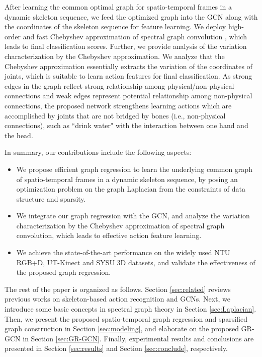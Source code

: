 \documentclass[conference]{IEEEtran}
\begin{document}
After learning the common optimal graph for spatio-temporal frames in a dynamic skeleton sequence, we feed the optimized graph into the GCN along with the coordinates of the skeleton sequence for feature learning. We deploy high-order and fast Chebyshev approximation of spectral graph convolution \cite{defferrard2016convolutional}, which leads to final classification scores. Further, we provide analysis of the variation characterization by the Chebyshev approximation. We analyze that the Chebyshev approximation essentially extracts the variation of the coordinates of joints, which is suitable to learn action features for final classification. As strong edges in the graph reflect strong relationship among physical/non-physical connections and weak edges represent potential relationship among non-physical connections, the proposed network strengthens learning actions which are accomplished by joints that are not bridged by bones (i.e., non-physical connections), such as ``drink water" with the interaction between one hand and the head. 


In summary, our contributions include the following aspects:
\begin{itemize}
\setlength{\itemsep}{3pt}
\setlength{\parsep}{0pt}
\setlength{\parskip}{0pt}
    \item We propose efficient graph regression to learn the underlying common graph of spatio-temporal frames in a dynamic skeleton sequence, by posing an optimization problem on the graph Laplacian from the constraints of data structure and sparsity.  
    \item We integrate our graph regression with the GCN, and analyze the variation characterization by the Chebyshev approximation of spectral graph convolution, which leads to effective action feature learning.    
    \item We achieve the state-of-the-art performance on the widely used NTU RGB+D, UT-Kinect and SYSU 3D datasets, and validate the effectiveness of the proposed graph regression.
\end{itemize}

The rest of the paper is organized as follows. Section \ref{sec:related} reviews previous works on skeleton-based action recognition and GCNs. Next, we introduce some basic concepts in spectral graph theory in Section \ref{sec:Laplacian}. Then, we present the proposed spatio-temporal graph regression and sparsified graph construction in Section \ref{sec:modeling}, and elaborate on the proposed GR-GCN in Section \ref{sec:GR-GCN}. Finally, experimental results and conclusions are presented in Section \ref{sec:results} and Section \ref{sec:conclude}, respectively.
\end{document}
